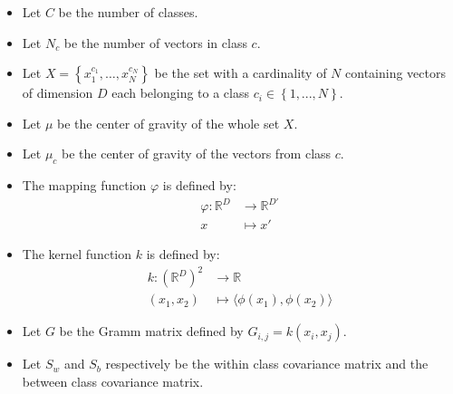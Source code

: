 
\begin{itemize}
  \item Let $C$ be the number of classes.
  \item Let $N_c$ be the number of vectors in class $c$.
  \item Let $X = \left\{x^{c_1}_1, \ldots, x^{c_N}_N\right\}$ be the set with a cardinality of $N$ containing
  vectors of dimension $D$ each belonging to a class $c_i \in \left\{1, ..., N\right\}$.
  \item Let $\mu$ be the center of gravity of the whole set $X$.
  \item Let $\mu_c$ be the center of gravity of the vectors from class $c$.
  \item The mapping function $\varphi$ is defined by:
  	\begin{align*}
   		\varphi : \mathbb{R}^D &\to \mathbb{R}^{D'}\\
   		x &\mapsto x'
   	\end{align*}
  \item The kernel function $k$ is defined by:
  	\begin{align*}
   		k : \left(\mathbb{R}^D\right)^2 &\to \mathbb{R}\\
   		(x_1, x_2) &\mapsto \langle \phi(x_1), \phi(x_2)\rangle
   	\end{align*}
  \item Let $G$ be the Gramm matrix defined by $G_{i,j} = k(x_i, x_j)$.
  \item Let $S_w$ and $S_b$ respectively be the within class covariance matrix and the between class covariance matrix. 
\end{itemize}
